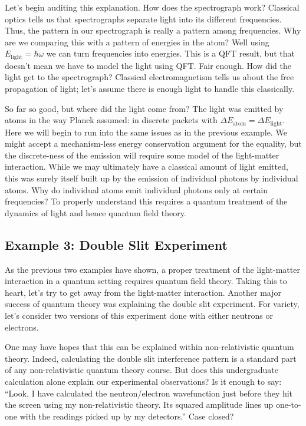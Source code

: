 \documentclass[12pt,prd,superscriptaddress,floatfix,amsmath,amssymb,amsfonts,nofootinbib]{revtex4-2}
\begin{document}
Let's begin auditing this explanation. How does the spectrograph work? Classical optics tells us that spectrographs separate light into its different frequencies. Thus, the pattern in our spectrograph is really a pattern among frequencies. Why are we comparing this with a pattern of energies in the atom? Well using $E_\text{light}=\hbar\omega$ we can turn frequencies into energies. This is a QFT result, but that doesn't mean we have to model the light using QFT. Fair enough. How did the light get to the spectrograph? Classical electromagnetism tells us about the free propagation of light; let's assume there is enough light to handle this classically.

So far so good, but where did the light come from? The light was emitted by atoms in the way Planck assumed: in discrete packets with \mbox{$\Delta E_\text{atom}=\Delta E_\text{light}$}. Here we will begin to run into the same issues as in the previous example. We might accept a mechanism-less energy conservation argument for the equality, but the discrete-ness of the emission will require some model of the light-matter interaction. While we may ultimately have a classical amount of light emitted, this was surely itself built up by the emission of individual photons by individual atoms. Why do individual atoms emit individual photons only at certain frequencies? To properly understand this requires a quantum treatment of the dynamics of light and hence quantum field theory.

\subsection{Example 3: Double Slit Experiment}\label{SecDoubleSlit}
As the previous two examples have shown, a proper treatment of the light-matter interaction in a quantum setting requires quantum field theory. Taking this to heart, let's try to get away from the light-matter interaction. Another major success of quantum theory was explaining the double slit experiment. For variety, let's consider two versions of this experiment done with either neutrons or electrons.

One may have hopes that this can be explained within non-relativistic quantum theory. Indeed, calculating the double slit interference pattern is a standard part of any non-relativistic quantum theory course. But does this undergraduate calculation alone explain our experimental observations? Is it enough to say: ``Look, I have calculated the neutron/electron wavefunction just before they hit the screen using my non-relativistic theory. Its squared amplitude lines up one-to-one with the readings picked up by my detectors.'' Case closed? 
\end{document}
